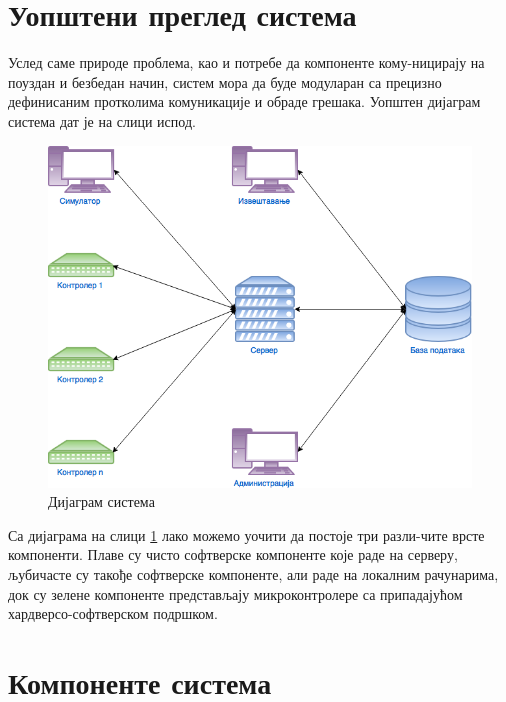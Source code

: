 \documentclass[a4paper, 12pt, diplomski]{etfcyr}
\begin{document}
		\section{Уопштени преглед система}
			\begin{justify}
				Услед саме природе проблема, као и потребе да компоненте кому-ницирају на поуздан и безбедан начин, систем мора да буде модуларан са прецизно дефинисаним протколима комуникације и обраде грешака. Уопштен дијаграм система дат је на слици испод.

				\begin{figure}[h]
					\begin{center}
						\includegraphics[scale=0.47]{SystemOverview.png}
					\end{center}
					\caption{Дијаграм система}
					\label{figure:1}
				\end{figure}

				Са дијаграма на слици \ref{figure:1} лако можемо уочити да постоје три разли-чите врсте компоненти. Плаве су чисто софтверске компоненте које раде на серверу, љубичасте су такође софтверске компоненте, али раде на локалним рачунарима, док су зелене компоненте представљају микроконтролере са припадајућом хардверсо-софтверском подршком.
			\end{justify}

		\section{Компоненте система}
\end{document}
